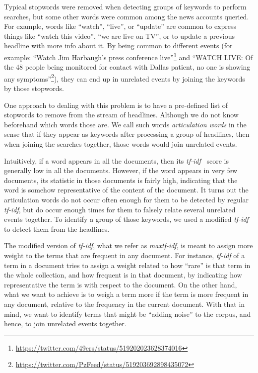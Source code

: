 Typical stopwords were removed when detecting groups of keywords to perform
searches, but some other words were common among the news accounts queried. 
%
For example, words like ``watch'', ``live'', or ``update'' are common to express
things like ``watch this video'', ``we are live on TV'', or to update a previous
headline with more info about it. 
%
By being common to different events (for example: ``Watch Jim Harbaugh's press
conference
live''\footnote{\url{https://twitter.com/49ers/status/519202023628374016}}  and
``WATCH LIVE: Of the 48 people being monitored for contact with Dallas patient,
no one is showing any
symptoms''\footnote{\url{https://twitter.com/PzFeed/status/519203692898435072}}),
they can end up in unrelated events by joining the keywords by those stopwords.


One approach to dealing with this problem is to have a pre-defined list of
stopwords to remove from the stream of headlines. 
%
Although we do not know beforehand which words those are. 
%
We call such words \emph{articulation words} in the sense that if they appear as
keywords after processing a group of headlines, then when joining the searches
together, those words would join unrelated events. 


Intuitively, if a word appears in all the documents, then its {\em
tf-idf}~\cite{sparck1972statistical} score is generally low in all the
documents.  
%
However, if the word appears in very few documents, its statistic in those
documents is fairly high, indicating that the word is somehow representative of
the content of the document. 
%
It turns out the articulation words do not occur often enough for them to be
detected by regular \emph{tf-idf}, but do occur enough times for them to falsely
relate several unrelated events together. 
%
To identify a group of those keywords, we used a modified \emph{tf-idf} to
detect them from the headlines.

The modified version of \emph{tf-idf}, what we refer as \emph{maxtf-idf}, is
meant to assign more weight to the terms that are frequent in any document. 
%
For instance, \emph{tf-idf} of a term in a document tries to assign a weight
related to how ``rare'' is that term in the whole collection, and how frequent
is in that document, by indicating how representative the term is with respect
to the document. 
%
On the other hand, what we want to achieve is to weigh a term more if the term
is more frequent in any document, relative to the frequency in the current
document. 
%
With that in mind, we want to identify terms that might be ``adding noise'' to
the corpus, and hence, to join unrelated events together.

